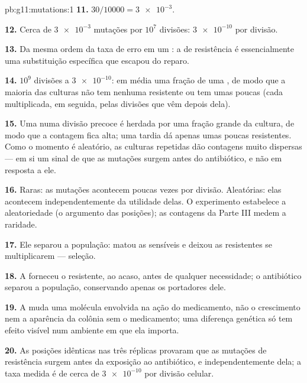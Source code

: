 \begin{solution}{pb:g11:mutations:1}
\textbf{11.} $30/\num{10000} = \num{3e-3}$.

\textbf{12.} Cerca de $\num{3e-3}$ mutações por $10^7$ divisões:
$\num{3e-10}$ por divisão.

\textbf{13.} Da mesma ordem da taxa de erro em um : a
 de resistência é essencialmente uma substituição específica que
escapou do reparo.

\textbf{14.} $10^9$ divisões a $\num{3e-10}$: em média uma fração de
uma , de modo que a maioria das culturas não tem nenhuma 
resistente ou tem umas poucas (cada  multiplicada, em seguida,
pelas divisões que vêm depois dela).

\textbf{15.} Uma  numa divisão precoce é herdada por uma fração
grande da cultura, de modo que a contagem fica alta; uma tardia dá
apenas umas poucas  resistentes. Como o momento é aleatório, as
culturas repetidas dão contagens muito dispersas --- em si um sinal de
que as mutações surgem antes do antibiótico, e não em resposta a ele.

\textbf{16.} Raras: as mutações acontecem poucas vezes por divisão.
Aleatórias: elas acontecem independentemente da utilidade delas. O
experimento estabelece a aleatoriedade (o argumento das posições); as
contagens da Parte III medem a raridade.

\textbf{17.} Ele separou a população: matou as  sensíveis e
deixou as resistentes se multiplicarem --- seleção.

\textbf{18.} A  forneceu o  resistente, ao acaso, antes de
qualquer necessidade; o antibiótico separou a população, conservando
apenas os portadores dele.

\textbf{19.} A  muda uma molécula envolvida na ação do
medicamento, não o crescimento nem a aparência da colônia sem o
medicamento; uma diferença genética só tem efeito visível num ambiente
em que ela importa.

\textbf{20.} As posições idênticas nas três réplicas provaram que as
mutações de resistência surgem antes da exposição ao antibiótico, e
independentemente dela; a taxa medida é de cerca de $\num{3e-10}$ por
divisão celular.
\end{solution}
